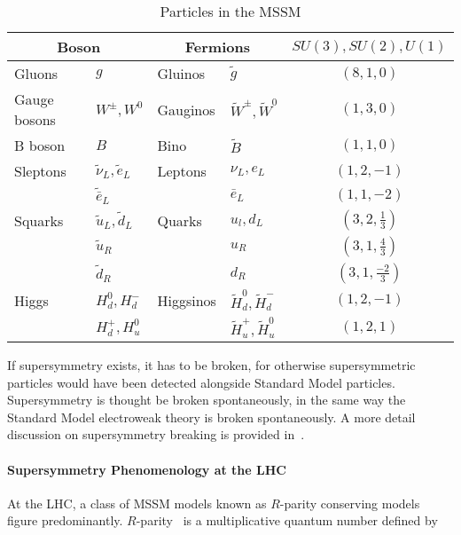 \begin{table}[H]
	\centering
	\begin{tabular}{l l | l l | c}
		\multicolumn{2}{c}{Boson} & \multicolumn{2}{c}{Fermions} & $SU(3), SU(2), U(1)$ \\
		\hline\hline
		Gluons       & $g$                          & Gluinos   & $\tilde{g}$                    & $(8, 1, 0)$            \\
		Gauge bosons & $W^{\pm}, W^0$               & Gauginos  & $\tilde{W}^{\pm}, \tilde{W}^0$ & $(1, 3, 0)$            \\
		B boson      & $B$                          & Bino      & $\tilde{B}$                    & $(1, 1, 0)$            \\
		\hline
		Sleptons     & $\tilde{\nu}_L, \tilde{e}_L$ & Leptons   & $\nu_L, e_L$                   & $(1, 2, -1)$           \\
		             & $\tilde{\bar{e}}_L$          &           & $\bar{e}_L$                    & $(1, 1, -2)$           \\
		\hline
		Squarks      & $\tilde{u}_L, \tilde{d}_L$   & Quarks    & $u_l, d_L$                     & $(3, 2, \frac{1}{3})$  \\
		             & $\tilde{u}_R$                &           & $u_R$                          & $(3, 1, \frac{4}{3})$  \\
		             & $\tilde{d}_R$                &           & $d_R$                          & $(3, 1, \frac{-2}{3})$ \\
		\hline
		Higgs        & $H_d^0, H_d^-$               & Higgsinos & $\tilde{H}_d^0, \tilde{H}_d^-$ & $(1, 2, -1)$           \\
		             & $H_d^+, H_u^0$               &           & $\tilde{H}_u^+, \tilde{H}_u^0$ & $(1, 2, 1)$            \\
		\hline\hline
	\end{tabular}
	\caption{Particles in the MSSM}
	\label{t:mssmchiral}
\end{table}

If supersymmetry exists, it has to be broken, for otherwise supersymmetric
particles would have been detected alongside Standard Model particles.
Supersymmetry is thought be broken spontaneously, in the same way the Standard
Model electroweak theory is broken spontaneously. A more detail discussion on
supersymmetry breaking is provided in~\cite{susytext01}.

\paragraph{Supersymmetry Phenomenology at the LHC} At the LHC, a class of MSSM
models known as $R$-parity conserving models figure predominantly.
$R$-parity~\cite{susytext01, susytext02} is a multiplicative quantum number
defined by

